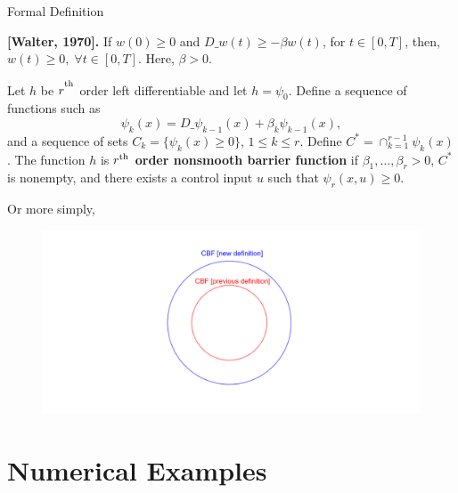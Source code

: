 \documentclass[aspectratio=169,xcolor=dvipsnames]{beamer}
\begin{document}
\begin{frame}{Formal Definition}
    
\begin{theorem}
\label{th:Higher-order-comparison-lemma-with-left-derivative-condition}
{\bf [Walter, 1970].} If $w(0)\geq 0$ and $D\_w(t)\geq -\beta w(t)$, for $t\in [0,T]$, then, $w(t)\geq 0,\;\forall t\in[0,T]$. Here, $\beta>0$.
\end{theorem}
Let $h$ be $r^\textsuperscript{th}$ order left differentiable and let $h=\psi_0$. Define a sequence of functions such as
\[
\psi_k(x) = D\_\psi_{k-1}(x)+\beta_k\psi_{k-1}(x),
\]
and a sequence of sets
$C_k=\{\psi_k(x)\geq 0\}$, $1\leq k\leq r$. Define  $C^*=\cap_{k=1}^{r-1}\psi_k(x)$. The function $h$ is {\bf $r\textsuperscript{th}$ order nonsmooth barrier function} %
if $\beta_1,\ldots,\beta_r>0$, $C^*$ is nonempty, and there exists a control input $u$ such that $\psi_r(x,u)\geq 0$.
\end{frame}

\begin{frame}{Or more simply,}
    \begin{figure}
    \includegraphics[width=0.8\linewidth]{cbf diagram.png}
    \end{figure}
\end{frame}

\section{Numerical Examples}
\end{document}
